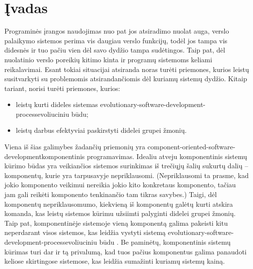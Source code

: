 \chapter{Įvadas}

Programinės įrangos naudojimas nuo pat jos atsiradimo nuolat auga,
verslo palaikymo sistemos perima vis daugiau verslo funkcijų, todėl
jos tampa vis didesnės ir tuo pačiu vien dėl savo dydžio tampa
sudėtingos. Taip pat, dėl nuolatinio verslo poreikių kitimo kinta
ir programų sistemoms keliami reikalavimai. Esant tokiai situacijai
atsiranda noras turėti priemones, kurios leistų susitvarkyti
su problemomis atsirandančiomis dėl kuriamų sistemų dydžio. Kitaip
tariant, norisi turėti priemones, kurios:
\begin{itemize}
  \item leistų kurti dideles sistemas
    \gls{evolutionary-software-development-process}{evoliuciniu būdu};
  \item leistų darbus efektyviai paskirstyti didelei grupei žmonių.
\end{itemize}

Viena iš šias galimybes žadančių priemonių yra
\gls{component-oriented-software-development}{komponentinis programavimas}.
Idealiu atveju komponentinis sistemų kūrimo būdas yra veikiančios
sistemos surinkimas iš trečiųjų šalių sukurtų dalių –
komponentų, kurie yra tarpusavyje nepriklausomi. (Nepriklausomi ta
prasme, kad jokio komponento veikimui nereikia jokio kito konkretaus
komponento, tačiau jam gali reikėti komponento tenkinančio tam
tikras savybes.) Taigi, dėl komponentų nepriklausomumo, kiekvieną iš
komponentų galėtų kurti atskira komanda, kas leistų sistemos kūrimu
užsiimti palyginti didelei grupei žmonių. Taip pat, komponentinėje
sistemoje vieną komponentą galima pakeisti kitu neperdarant visos
sistemos, kas leidžia vystyti sistemą
\gls{evolutionary-software-development-process}{evoliuciniu būdu}%
\cite[6]{cs-beyond-object-oriented-programming}. Be paminėtų,
komponentinis sistemų kūrimas turi dar ir tą privalumą, kad tuos
pačius komponentus galima panaudoti keliose skirtingose sistemose, kas
leidžia sumažinti kuriamų sistemų
kainą\cite[6]{cs-beyond-object-oriented-programming}.

